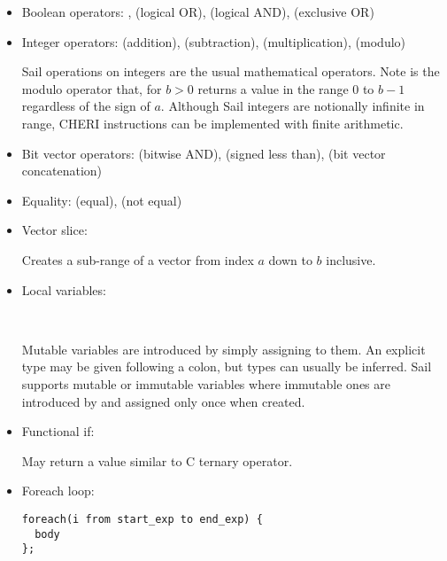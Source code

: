 \begin{itemize}
\item \label{sailRISCVznot}\label{sailMIPSznot}Boolean operators:
, \isail{|} (logical OR), \isail{&} (logical AND), \isail{^} (exclusive OR)

\item Integer operators:
\isail{+} (addition), \isail{-} (subtraction), \isail{*} (multiplication), \isail{\%} (modulo)

Sail operations on integers are the usual mathematical operators. Note  is the modulo operator that, for $b > 0$ returns a value in the range $0$ to $b-1$ regardless of the sign of $a$. Although Sail integers are notionally infinite in range, CHERI instructions can be implemented with finite arithmetic.

\item Bit vector operators:
\isail{&} (bitwise AND),  (signed less than),  (bit vector concatenation)

\item Equality:
\isail{==} (equal), \isail{!=} (not equal)

\item Vector slice:


Creates a sub-range of a vector from index $a$ down to $b$ inclusive.

\item Local variables:

   \\

Mutable variables are introduced by simply assigning to them. An explicit type may be given following a colon, but types can usually be inferred. Sail supports mutable or immutable variables where immutable ones are introduced by  and assigned only once when created.

\item Functional if:


May return a value similar to C ternary operator.


\item Foreach loop:

\begin{lstlisting}[language=sail,label=sailMIPSzto]
foreach(i from start_exp to end_exp) {
  body
};
\end{lstlisting}


\end{itemize}
